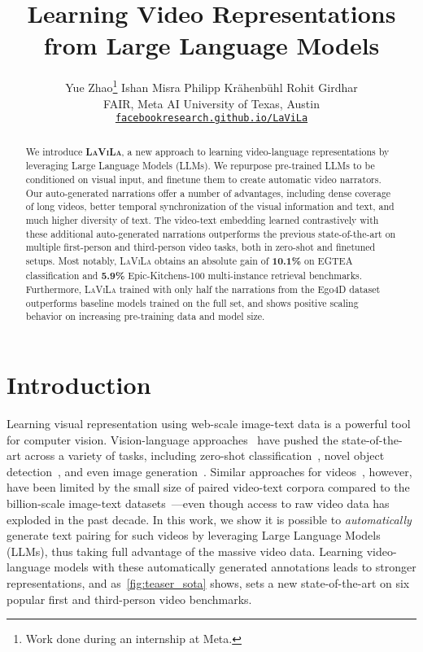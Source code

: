 \documentclass[10pt,twocolumn,letterpaper]{article}
\newcommand{\ours}{\textsc{LaViLa}\xspace}
\begin{document}
\title{Learning Video Representations from Large Language Models}

\author{
	Yue Zhao\thanks{Work done during an internship at Meta.} \quad Ishan Misra \quad Philipp Kr\"ahenb\"uhl \quad Rohit Girdhar \\
	FAIR, Meta AI \quad University of Texas, Austin \\
	{\small \href{https://facebookresearch.github.io/LaViLa}{\tt facebookresearch.github.io/LaViLa}}
}


\maketitle

\begin{abstract}
  We introduce {\bf \ours}, a new approach to learning video-language representations by leveraging Large Language Models (LLMs). We repurpose pre-trained LLMs to be conditioned on visual input, and finetune them to create automatic video narrators. Our auto-generated narrations offer a number of advantages, including dense coverage of long videos, better temporal synchronization of the visual information and text, and much higher diversity of text. The video-text embedding learned contrastively with these additional auto-generated narrations outperforms the previous state-of-the-art on multiple first-person and third-person video tasks, both in zero-shot and finetuned setups. Most notably, \ours obtains an absolute gain of {\bf 10.1\%} on EGTEA classification and {\bf 5.9\%} Epic-Kitchens-100 multi-instance retrieval benchmarks. Furthermore, \ours trained with only half the narrations from the Ego4D dataset outperforms baseline models trained on the full set, and shows positive scaling behavior on increasing pre-training data and model size.
\end{abstract} \section{Introduction}


Learning visual representation using web-scale image-text data is a powerful tool for computer vision. Vision-language approaches~\cite{radford2021clip,yu2022coca,jia2021align} have pushed the state-of-the-art across a variety of tasks, including
zero-shot classification~\cite{radford2021clip}, novel object detection~\cite{zhou2022detecting}, and even image generation~\cite{ramesh2022hierarchical}.
Similar approaches for videos~\cite{bain2021frozen,nagrani2022learning,lin2022egovlp}, however, have been limited by the small size of paired video-text corpora compared to the billion-scale image-text datasets~\cite{radford2021clip,jia2021align,zhai2022scaling}---even though access to
raw video data has exploded in the past decade. In this work, we show it is possible to {\em automatically} generate text pairing for such videos by leveraging Large Language Models (LLMs), thus taking full advantage of the massive video data.
Learning video-language models with these automatically generated annotations leads to stronger representations,
and as~\cref{fig:teaser_sota} shows, sets a new state-of-the-art on six popular first and third-person video benchmarks.
\end{document}
